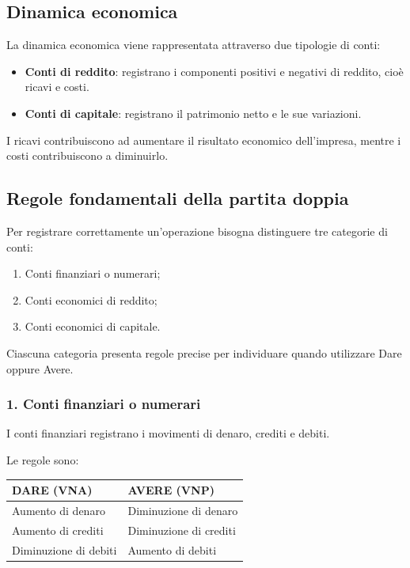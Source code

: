 \subsection{Dinamica economica}

\noindent La dinamica economica viene rappresentata
attraverso due tipologie di conti:

\begin{itemize}
    \item \textbf{Conti di reddito}: registrano
    i componenti positivi e negativi di reddito,
    cioè ricavi e costi.

    \item \textbf{Conti di capitale}: registrano
    il patrimonio netto e le sue variazioni.
\end{itemize}

\noindent I ricavi contribuiscono ad aumentare
il risultato economico dell'impresa, mentre
i costi contribuiscono a diminuirlo.


\subsection{Regole fondamentali della partita doppia}

\noindent Per registrare correttamente un'operazione
bisogna distinguere tre categorie di conti:

\begin{enumerate}
    \item Conti finanziari o numerari;
    \item Conti economici di reddito;
    \item Conti economici di capitale.
\end{enumerate}

\noindent Ciascuna categoria presenta regole precise
per individuare quando utilizzare Dare oppure Avere.


\subsubsection*{1. Conti finanziari o numerari}

\noindent I conti finanziari registrano i movimenti
di denaro, crediti e debiti.

\medskip

\noindent Le regole sono:

\begin{center}
\begin{tabular}{|l|l|}
\hline
\textbf{DARE (VNA)} & \textbf{AVERE (VNP)} \\
\hline
Aumento di denaro & Diminuzione di denaro \\
\hline
Aumento di crediti & Diminuzione di crediti \\
\hline
Diminuzione di debiti & Aumento di debiti \\
\hline
\end{tabular}
\end{center}

